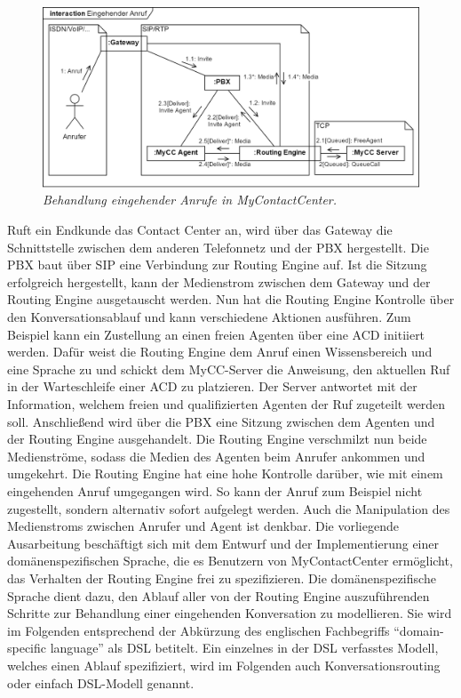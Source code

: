 \begin{figure} %
	\centering
		\includegraphics[width=\textwidth]{img/RoutingEngineSipExplanation.png}
	\caption[Behandlung eingehender Rufe in MyContactCenter]{\textit{Behandlung eingehender Anrufe in MyContactCenter.}}
	\label{fig:InteractionIncomingCall}
\end{figure}
\noindent Ruft ein Endkunde das Contact Center an, wird über das Gateway die Schnittstelle zwischen dem anderen Telefonnetz und der PBX hergestellt. Die PBX baut über SIP eine Verbindung zur Routing Engine auf. Ist die Sitzung erfolgreich hergestellt, kann der Medienstrom zwischen dem Gateway und der Routing Engine ausgetauscht werden. Nun hat die Routing Engine Kontrolle über den Konversationsablauf und kann verschiedene Aktionen ausführen. Zum Beispiel kann ein Zustellung an einen freien Agenten über eine ACD initiiert werden. Dafür weist die Routing Engine dem Anruf einen Wissensbereich und eine Sprache zu und schickt dem MyCC-Server die Anweisung, den aktuellen Ruf in der Warteschleife einer ACD zu platzieren. Der Server antwortet mit der Information, welchem freien und qualifizierten Agenten der Ruf zugeteilt werden soll. Anschließend wird über die PBX eine Sitzung zwischen dem Agenten und der Routing Engine ausgehandelt. Die Routing Engine verschmilzt nun beide Medienströme, sodass die Medien des Agenten beim Anrufer ankommen und umgekehrt. 
\newline
Die Routing Engine hat eine hohe Kontrolle darüber, wie mit einem eingehenden Anruf umgegangen wird. So kann der Anruf zum Beispiel nicht zugestellt, sondern alternativ sofort aufgelegt werden. Auch die Manipulation des Medienstroms zwischen Anrufer und Agent ist denkbar. Die vorliegende Ausarbeitung beschäftigt sich mit dem Entwurf und der Implementierung einer domänenspezifischen Sprache, die es Benutzern von MyContactCenter ermöglicht, das Verhalten der Routing Engine frei zu spezifizieren. Die domänenspezifische Sprache dient dazu, den Ablauf aller von der Routing Engine auszuführenden Schritte zur Behandlung einer eingehenden Konversation zu modellieren. Sie wird im Folgenden entsprechend der Abkürzung des englischen Fachbegriffs ``domain-specific language'' als DSL betitelt. Ein einzelnes in der DSL verfasstes Modell, welches einen Ablauf spezifiziert, wird im Folgenden auch Konversationsrouting oder einfach DSL-Modell genannt.
 
